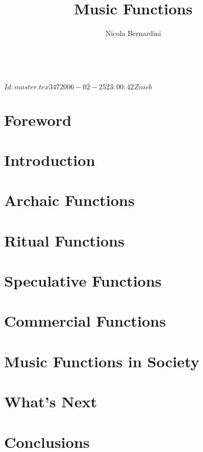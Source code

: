 \documentclass{scrbook}
\begin{document}
\svnInfo $Id: master.tex 347 2006-02-25 23:00:42Z nicb $

\frontmatter

\author{Nicola Bernardini\\
        \href{mailto:\cpholderemail}{\cpholderemailhidden}}
\date{~}
\lowertitleback{\copyrightnotice{\cpholder}{\cpholderemail}{\cpyear}}
\uppertitleback{This book was set with
     the help of {\KOMAScript} and {\LaTeX}}
\title{Music Functions}
\dedication{\itshape To those that help me understand music.}
\publishers{\rcstag}

\maketitle

\tableofcontents
\newpage


\chapter*{Foreword}

\mainmatter

\chapter{Introduction}



\chapter{Archaic Functions}

\chapter{Ritual Functions}

\chapter{Speculative Functions}

\chapter{Commercial Functions}



\chapter{Music Functions in Society}



\chapter{What's Next}



\chapter{Conclusions}



\backmatter
\end{document}
